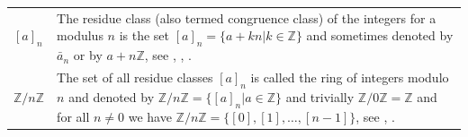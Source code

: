 \documentclass[12pt]{amsart}
\theoremstyle{definition}
\begin{document}
{\begin{table}[H]
\begin{tabular}{|P{1.4cm} p{13.4cm}|}
		\\
		$[a]_n$ & The residue class (also termed congruence class) of the integers for a modulus $n$ is the set $[a]_n=\{a+kn|k\in\mathbb{Z}\}$ and sometimes denoted by $\bar a_n$ or by $a+n\mathbb{Z}$, see \cite[p.~15]{Ref_Wolfart_2011}, \cite[p.~120]{Ref_Schubert_2009}, \cite[p.~25]{Ref_Mueller-Stach_2011}.
		\\
		$\mathbb{Z}/n\mathbb{Z}$ & The set of all residue classes $[a]_n$ is called the ring of integers modulo $n$ and denoted by $\mathbb{Z}/n\mathbb{Z}=\{[a]_n|a\in\mathbb{Z}\}$ and trivially $\mathbb{Z}/0\mathbb{Z}=\mathbb{Z}$ and for all $n\ne0$ we have $\mathbb{Z}/n\mathbb{Z}=\{[0],[1],\ldots,[n-1]\}$, see \cite[p.~15]{Ref_Wolfart_2011}, \cite[p.~25]{Ref_Mueller-Stach_2011}. 
		\\ \hline
	\end{tabular}
\end{table}}
\end{document}
